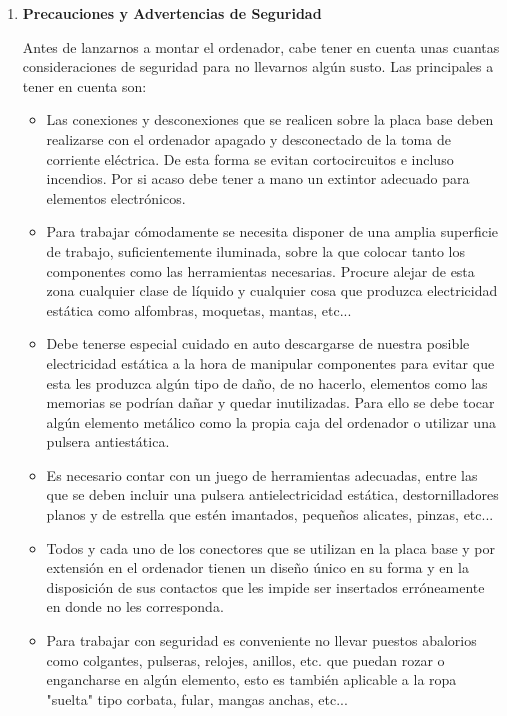 \begin{enumerate}
    \item \textbf{Precauciones y Advertencias de Seguridad}

    Antes de lanzarnos a montar el ordenador, cabe tener en cuenta unas cuantas consideraciones de seguridad para no llevarnos algún susto. Las principales a tener en cuenta son:

    \begin{itemize}
        \item Las conexiones y desconexiones que se realicen sobre la placa base deben realizarse con el ordenador apagado y desconectado de la toma de corriente eléctrica. De esta forma se evitan cortocircuitos e incluso incendios. Por si acaso debe tener a mano un extintor adecuado para elementos electrónicos.

        \item Para trabajar cómodamente se necesita disponer de una amplia superficie de trabajo, suficientemente iluminada, sobre la que colocar tanto los componentes como las herramientas necesarias. Procure alejar de esta zona cualquier clase de líquido y cualquier cosa que produzca electricidad estática como alfombras, moquetas, mantas, etc...

        \item Debe tenerse especial cuidado en auto descargarse de nuestra posible electricidad estática a la hora de manipular componentes para evitar que esta les produzca algún tipo de daño, de no hacerlo, elementos como las memorias se podrían dañar y quedar inutilizadas. Para ello se debe tocar algún elemento metálico como la propia caja del ordenador o utilizar una pulsera antiestática.

        \item Es necesario contar con un juego de herramientas adecuadas, entre las que se deben incluir una pulsera antielectricidad estática, destornilladores planos y de estrella que estén imantados, pequeños alicates, pinzas, etc...

        \item Todos y cada uno de los conectores que se utilizan en la placa base y por extensión en el ordenador tienen un diseño único en su forma y en la disposición de sus contactos que les impide ser insertados erróneamente en donde no les corresponda.

        \item Para trabajar con seguridad es conveniente no llevar puestos abalorios como colgantes, pulseras, relojes, anillos, etc. que puedan rozar o engancharse en algún elemento, esto es también aplicable a la ropa "suelta" tipo corbata, fular, mangas anchas, etc...


\end{itemize}
\end{enumerate}
